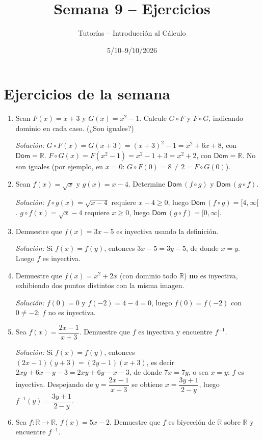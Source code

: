 \documentclass[11pt]{article}
\title{Semana 9 -- Ejercicios}
\author{Tutorías -- Introducción al Cálculo}
\date{5/10--9/10/2026}
\begin{document}
\maketitle

\section{Ejercicios de la semana}

\begin{enumerate}[label=\arabic*.]
\item Sean $F(x) = x+3$ y $G(x) = x^2 - 1$. Calcule $G\circ F$ y $F \circ G$, indicando dominio en
cada caso. (¿Son iguales?)

\textit{Solución:} $G\circ F(x) = G(x+3) = (x+3)^2-1 = x^2+6x+8$, con $\mathsf{Dom}=\mathbb{R}$.
$F\circ G(x) = F(x^2-1) = x^2-1+3 = x^2+2$, con $\mathsf{Dom}=\mathbb{R}$. No son iguales (por
ejemplo, en $x=0$: $G\circ F(0)=8 \neq 2 = F\circ G(0)$).

\item Sean $f(x) = \sqrt{x}$ y $g(x) = x-4$. Determine $\mathsf{Dom}\,(f\circ g)$ y
$\mathsf{Dom}\,(g \circ f)$.

\textit{Solución:} $f\circ g(x) = \sqrt{x-4}$ requiere $x-4\ge0$, luego $\mathsf{Dom}\,(f\circ g) =
[4,\infty[$. $g\circ f(x) = \sqrt{x}-4$ requiere $x\ge0$, luego $\mathsf{Dom}\,(g\circ f) =
[0,\infty[$.

\item Demuestre que $f(x) = 3x - 5$ es inyectiva usando la definición.

\textit{Solución:} Si $f(x)=f(y)$, entonces $3x-5=3y-5$, de donde $x=y$. Luego $f$ es inyectiva.

\item Demuestre que $f(x) = x^2 + 2x$ (con dominio todo $\mathbb{R}$) \textbf{no} es inyectiva,
exhibiendo dos puntos distintos con la misma imagen.

\textit{Solución:} $f(0)=0$ y $f(-2)=4-4=0$, luego $f(0)=f(-2)$ con $0\neq-2$; $f$ no es inyectiva.

\item Sea $f(x) = \dfrac{2x-1}{x+3}$. Demuestre que $f$ es inyectiva y encuentre $f^{-1}$.

\textit{Solución:} Si $f(x)=f(y)$, entonces $(2x-1)(y+3)=(2y-1)(x+3)$, es decir
$2xy+6x-y-3=2xy+6y-x-3$, de donde $7x=7y$, o sea $x=y$: $f$ es inyectiva. Despejando de
$y=\dfrac{2x-1}{x+3}$ se obtiene $x=\dfrac{3y+1}{2-y}$, luego $f^{-1}(y)=\dfrac{3y+1}{2-y}$.

\item Sea $f:\mathbb{R}\to\mathbb{R}$, $f(x) = 5x - 2$. Demuestre que $f$ es biyección de
$\mathbb{R}$ sobre $\mathbb{R}$ y encuentre $f^{-1}$.


\end{enumerate}
\end{document}
